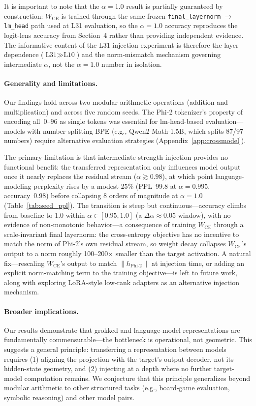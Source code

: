 \documentclass{article}
\begin{document}
It is important to note that the $\alpha=1.0$ result is partially
guaranteed by construction: $W_{\text{CE}}$ is trained through the same
frozen \texttt{final\_layernorm} $\rightarrow$ \texttt{lm\_head} path used
at L31 evaluation, so the $\alpha=1.0$ accuracy reproduces the logit-lens
accuracy from Section~4 rather than providing independent evidence.
The informative content of the L31 injection experiment is therefore the
layer dependence ($\text{L31} \gg \text{L10}$) and the norm-mismatch
mechanism governing intermediate $\alpha$, not the $\alpha=1.0$ number in
isolation.

\paragraph{Generality and limitations.}
Our findings hold across two modular arithmetic operations (addition and
multiplication) and across five random seeds.  The Phi-2 tokenizer's
property of encoding all~\mbox{$0$--$96$} as single tokens was essential for
lm-head-based evaluation---models with number-splitting BPE (e.g.,
Qwen2-Math-1.5B, which splits 87/97 numbers) require alternative evaluation
strategies (Appendix~\ref{app:crossmodel}).

The primary limitation is that intermediate-strength injection provides no
functional benefit: the transferred representation only influences model
output once it nearly replaces the residual stream ($\alpha \gtrsim 0.98$),
at which point language-modeling perplexity rises by a modest 25\% (PPL~99.8
at $\alpha=0.995$, accuracy~0.98) before collapsing 8 orders of magnitude
at $\alpha=1.0$ (Table~\ref{tab:seed_ppl}).  The transition is steep but
continuous---accuracy climbs from baseline to $1.0$ within $\alpha\in[0.95,
1.0]$ (a $\Delta\alpha\approx 0.05$ window), with no evidence of
non-monotonic behavior---a consequence of training $W_{\text{CE}}$ through
a scale-invariant final layernorm: the cross-entropy objective has no
incentive to match the norm of Phi-2's own residual stream, so weight
decay collapses $W_{\text{CE}}$'s output to a norm roughly
100--200$\times$ smaller than the target activation.
A natural fix---rescaling $W_{\text{CE}}$'s output to match
$\|h_{\text{Phi-2}}\|$ at injection time, or adding an explicit norm-matching
term to the training objective---is left to future work, along with exploring
LoRA-style low-rank adapters as an alternative injection mechanism.

\paragraph{Broader implications.}
Our results demonstrate that grokked and language-model representations are
fundamentally commensurable---the bottleneck is operational, not geometric.
This suggests a general principle: transferring a representation between
models requires (1) aligning the projection with the target's output
decoder, not its hidden-state geometry, and (2) injecting at a depth where
no further target-model computation remains.  We conjecture that this
principle generalizes beyond modular arithmetic to other structured tasks
(e.g., board-game evaluation, symbolic reasoning) and other model pairs.
\end{document}
